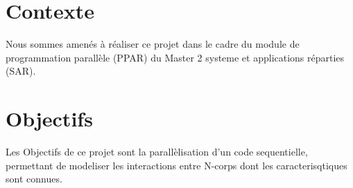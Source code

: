 \section{Contexte}
\par Nous sommes amenés à réaliser ce projet dans
le cadre du module de programmation parallèle (PPAR) du
Master 2 systeme et applications réparties (SAR).


\section{Objectifs}
\par Les Objectifs de ce projet sont la parallèlisation d'un code 
sequentielle, permettant de modeliser les interactions entre N-corps
dont les caracterisqtiques sont connues.
